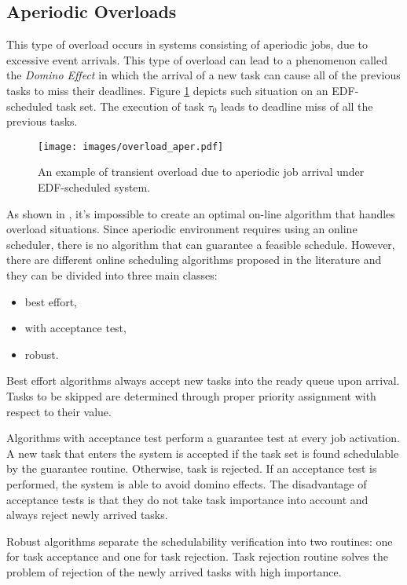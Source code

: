 \subsection{Aperiodic Overloads}
This type of overload occurs in systems consisting of aperiodic jobs, due to excessive event arrivals. 
This type of overload can lead to a phenomenon called the \textit{Domino Effect} in which the arrival of a new task can cause all of the previous tasks to miss their deadlines. 
Figure \ref{aperiodic} depicts such situation on an EDF-scheduled task set. 
The execution of task $\tau_0$ leads to deadline miss of all the previous tasks.

\begin{figure}[ht]
    \centering
    \texttt{[image: images/overload\_aper.pdf]}
    \caption{An example of transient overload due to aperiodic job arrival under EDF-scheduled system.}
    \label{aperiodic}
\end{figure}

As shown in \cite{buttazzo2011hard}, it's impossible to create an optimal on-line algorithm that handles overload situations.
Since aperiodic environment requires using an online scheduler, there is no algorithm that can guarantee a feasible schedule.
However, there are different online scheduling algorithms proposed in the literature and they can be divided into three main classes:
\begin{itemize}
    \item{best effort,}
    \item{with acceptance test,}
    \item{robust.}
\end{itemize}

Best effort algorithms always accept new tasks into the ready queue upon arrival. Tasks to be skipped are determined through proper priority assignment with respect to their value.

Algorithms with acceptance test perform a guarantee test at every job activation. 
A new task that enters the system is accepted if the task set is found schedulable by the guarantee routine. Otherwise, task is rejected.
If an acceptance test is performed, the system is able to avoid domino effects.
The disadvantage of acceptance tests is that they do not take task importance into account and always reject newly arrived tasks.

Robust algorithms separate the schedulability verification into two routines: one for task acceptance and one for task rejection. 
Task rejection routine solves the problem of rejection of the newly arrived tasks with high importance.

